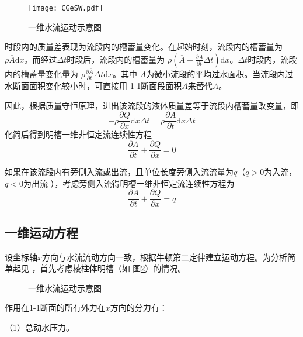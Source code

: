 \begin{figure}[hb]
  \centering
  \texttt{[image: CGeSW.pdf]}
  \caption{一维水流运动示意图}
  \label{FgCGe_1DSwe}
\end{figure}


时段内的质量差表现为流段内的槽蓄量变化。在起始时刻，流段内的槽蓄量为
$\rho\overline{A}\mathrm{d}x$。而经过$\Delta t$时段后，流段内的槽蓄量为
$\rho\left(\overline{A}+\frac{\partial\overline{A}}{\partial t}\Delta
t\right)\mathrm{d}x$。$\Delta t$时段内，流段内的槽蓄量变化量为
$\rho\frac{\partial \overline{A}}{\partial t}\Delta t\mathrm{d}x$。其中
$\overline{A}$为微小流段的平均过水面积。当流段内过水断面面积变化较小时，可直接用
1-1断面段面积$A$来替代$\overline{A}$。

因此，根据质量守恒原理，进出该流段的液体质量差等于流段内槽蓄量改变量，即
\begin{equation*}
  -\rho\frac{\partial Q}{\partial x}\mathrm{d}x\Delta t
  =
  \rho\frac{\partial A}{\partial t}\mathrm{d}x\Delta t
\end{equation*}
化简后得到明槽一维非恒定流连续性方程
\begin{equation}
  \frac{\partial A}{\partial t}
  +
  \frac{\partial Q}{\partial x}
  =
  0
  \label{EqCGe_SVe_Ce}
\end{equation}

如果在该流段内有旁侧入流或出流，且单位长度旁侧入流流量为$q$（$q>0$为入流，$q<0$为出流
），考虑旁侧入流得明槽一维非恒定流连续性方程为
\begin{equation}
  \frac{\partial A}{\partial t}
  +
  \frac{\partial Q}{\partial x}
  =
  q
\end{equation}

\subsection{一维运动方程}
设坐标轴$x$方向与水流流动方向一致，根据牛顿第二定律建立运动方程。为分析简单起见
，首先考虑棱柱体明槽（如
图\ref{FgCGe_1DSwe_Force}）的情况。

\begin{figure}[htb]
  \centering
\caption{一维水流运动示意图}
\label{FgCGe_1DSwe_Force}
\end{figure}


作用在1-1断面的所有外力在$x$方向的分力有：

（1）总动水压力。

